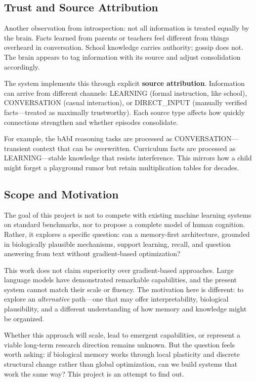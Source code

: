 \documentclass[11pt]{article}
\begin{document}
\subsection{Trust and Source Attribution}

Another observation from introspection: not all information is treated equally by the brain. Facts learned from parents or teachers feel different from things overheard in conversation. School knowledge carries authority; gossip does not. The brain appears to tag information with its source and adjust consolidation accordingly.

The system implements this through explicit \textbf{source attribution}. Information can arrive from different channels: LEARNING (formal instruction, like school), CONVERSATION (casual interaction), or DIRECT\_INPUT (manually verified facts---treated as maximally trustworthy). Each source type affects how quickly connections strengthen and whether episodes consolidate.

For example, the bAbI reasoning tasks \citep{weston2015towards} are processed as CONVERSATION---transient context that can be overwritten. Curriculum facts are processed as LEARNING---stable knowledge that resists interference. This mirrors how a child might forget a playground rumor but retain multiplication tables for decades.

\subsection{Scope and Motivation}

The goal of this project is not to compete with existing machine learning systems on standard benchmarks, nor to propose a complete model of human cognition. Rather, it explores a specific question: can a memory-first architecture, grounded in biologically plausible mechanisms, support learning, recall, and question answering from text without gradient-based optimization?

This work does not claim superiority over gradient-based approaches. Large language models have demonstrated remarkable capabilities, and the present system cannot match their scale or fluency. The motivation here is different: to explore an \emph{alternative} path---one that may offer interpretability, biological plausibility, and a different understanding of how memory and knowledge might be organized.

Whether this approach will scale, lead to emergent capabilities, or represent a viable long-term research direction remains unknown. But the question feels worth asking: if biological memory works through local plasticity and discrete structural change rather than global optimization, can we build systems that work the same way? This project is an attempt to find out.
\end{document}
